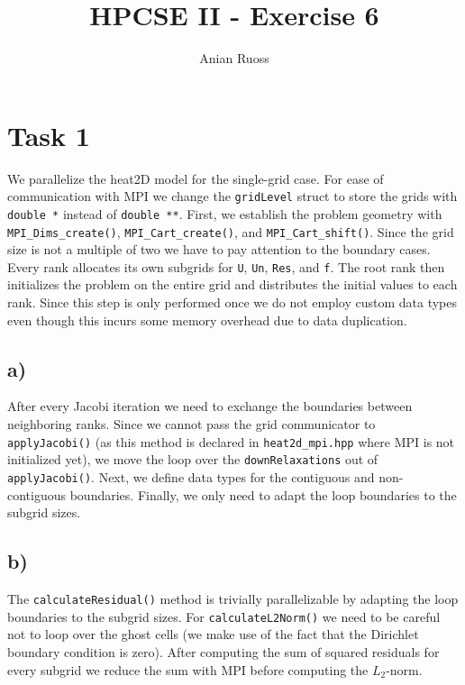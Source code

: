 \documentclass{article}
\begin{document}
    \title{HPCSE II - Exercise 6}
    \author{Anian Ruoss}
    \maketitle

    \section*{Task 1}
    \label{sec:Task1}

    We parallelize the heat2D model for the single-grid case.
    For ease of communication with MPI we change the \lstinline{gridLevel}
    struct to store the grids with \lstinline{double *} instead of
    \lstinline{double **}.
    First, we establish the problem geometry with
    \lstinline{MPI_Dims_create()}, \lstinline{MPI_Cart_create()}, and
    \lstinline{MPI_Cart_shift()}.
    Since the grid size is not a multiple of two we have to pay attention to
    the boundary cases.
    Every rank allocates its own subgrids for \lstinline{U}, \lstinline{Un},
    \lstinline{Res}, and \lstinline{f}.
    The root rank then initializes the problem on the entire grid and
    distributes the initial values to each rank.
    Since this step is only performed once we do not employ custom data
    types even though this incurs some memory overhead due to data duplication.

    \subsection*{a)}
    \label{subsec:Task1a}

    After every Jacobi iteration we need to exchange the boundaries between
    neighboring ranks.
    Since we cannot pass the grid communicator to \lstinline{applyJacobi()}
    (as this method is declared in \lstinline{heat2d_mpi.hpp} where MPI is
    not initialized yet), we move the loop over the
    \lstinline{downRelaxations} out of \lstinline{applyJacobi()}.
    Next, we define data types for the contiguous and non-contiguous
    boundaries.
    Finally, we only need to adapt the loop boundaries to the subgrid sizes.

    \subsection*{b)}
    \label{subsec:Task1b}

    The \lstinline{calculateResidual()} method is trivially parallelizable
    by adapting the loop boundaries to the subgrid sizes.
    For \lstinline{calculateL2Norm()} we need to be careful not to loop over
    the ghost cells (we make use of the fact that the Dirichlet boundary
    condition is zero).
    After computing the sum of squared residuals for every subgrid we reduce
    the sum with MPI before computing the $L_2$-norm.
\end{document}
